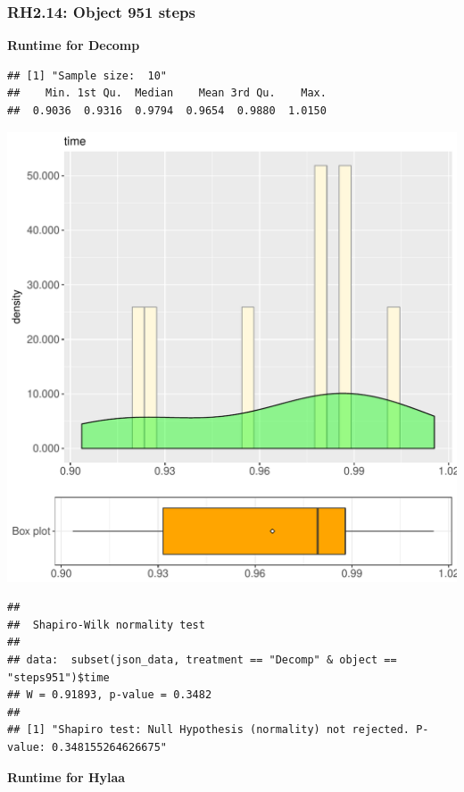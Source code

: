 \documentclass{article}\usepackage[]{graphicx}\usepackage[]{color}
\makeatletter
\def\maxwidth{ %
  \ifdim\Gin@nat@width>\linewidth
    \linewidth
  \else
    \Gin@nat@width
  \fi
}
\newenvironment{kframe}{%
 \def\at@end@of@kframe{}%
 \ifinner\ifhmode%
  \def\at@end@of@kframe{\end{minipage}}%
  \begin{minipage}{\columnwidth}%
 \fi\fi%
 \def\FrameCommand##1{\hskip\@totalleftmargin \hskip-\fboxsep
 \colorbox{shadecolor}{##1}\hskip-\fboxsep
     \hskip-\linewidth \hskip-\@totalleftmargin \hskip\columnwidth}%
 \MakeFramed {\advance\hsize-\width
   \@totalleftmargin\z@ \linewidth\hsize
   \@setminipage}}%
 {\par\unskip\endMakeFramed%
 \at@end@of@kframe}
\newenvironment{knitrout}{}{} %
\makeatother
\begin{document}
\subsubsection{RH2.14: Object 951 steps}

 \textbf{Runtime for Decomp}
\begin{knitrout}
\color{fgcolor}\begin{kframe}
\begin{verbatim}
## [1] "Sample size:  10"
##    Min. 1st Qu.  Median    Mean 3rd Qu.    Max. 
##  0.9036  0.9316  0.9794  0.9654  0.9880  1.0150
\end{verbatim}
\end{kframe}
\includegraphics[width=\maxwidth]{figure/RH2_Decomp_steps951-1} 
\begin{kframe}\begin{verbatim}
## 
## 	Shapiro-Wilk normality test
## 
## data:  subset(json_data, treatment == "Decomp" & object == "steps951")$time
## W = 0.91893, p-value = 0.3482
## 
## [1] "Shapiro test: Null Hypothesis (normality) not rejected. P-value: 0.348155264626675"
\end{verbatim}
\end{kframe}
\end{knitrout}
 \textbf{Runtime for Hylaa}
\end{document}
